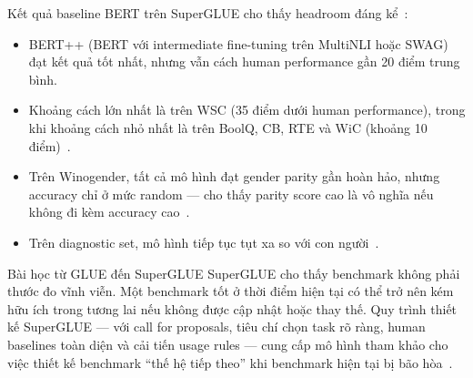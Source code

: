 Kết quả baseline BERT trên SuperGLUE cho thấy headroom đáng kể~\cite{superglue}:

\begin{itemize}
    \item BERT++ (BERT với intermediate fine-tuning trên MultiNLI hoặc SWAG) đạt kết quả tốt nhất, nhưng vẫn cách human performance gần 20 điểm trung bình.
    \item Khoảng cách lớn nhất là trên WSC (35 điểm dưới human performance), trong khi khoảng cách nhỏ nhất là trên BoolQ, CB, RTE và WiC (khoảng 10 điểm)~\cite{superglue}.
    \item Trên Winogender, tất cả mô hình đạt gender parity gần hoàn hảo, nhưng accuracy chỉ ở mức random --- cho thấy parity score cao là vô nghĩa nếu không đi kèm accuracy cao~\cite{superglue}.
    \item Trên diagnostic set, mô hình tiếp tục tụt xa so với con người~\cite{superglue}.
\end{itemize}

\begin{summarybox}{Bài học từ GLUE đến SuperGLUE}
SuperGLUE cho thấy benchmark không phải thước đo vĩnh viễn. Một benchmark tốt ở thời điểm hiện tại có thể trở nên kém hữu ích trong tương lai nếu không được cập nhật hoặc thay thế. Quy trình thiết kế SuperGLUE --- với call for proposals, tiêu chí chọn task rõ ràng, human baselines toàn diện và cải tiến usage rules --- cung cấp mô hình tham khảo cho việc thiết kế benchmark ``thế hệ tiếp theo'' khi benchmark hiện tại bị bão hòa~\cite{superglue}.
\end{summarybox}